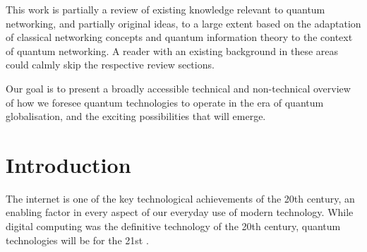 \documentclass[aps, rmp, twocolumn, amsmath, amssymb, nofootinbib, superscriptaddress, longbibliography, floatfix, table-of-contents, eqsecnum]{revtex4-1}
\begin{document}
This work is partially a review of existing knowledge relevant to quantum networking, and partially original ideas, to a large extent based on the adaptation of classical networking concepts and quantum information theory to the context of quantum networking. A reader with an existing background in these areas could calmly skip the respective review sections.

Our goal is to present a broadly accessible technical and non-technical overview of how we foresee quantum technologies to operate in the era of quantum globalisation, and the exciting possibilities that will emerge.

%
%

\section{Introduction} \label{sec:introduction}

The internet is one of the key technological achievements of the 20th century, an enabling factor in every aspect of our everyday use of modern technology. While digital computing was the definitive technology of the 20th century, quantum technologies will be for the 21st \cite{bib:NielsenChuang00, bib:Bennett00}. 
\end{document}
